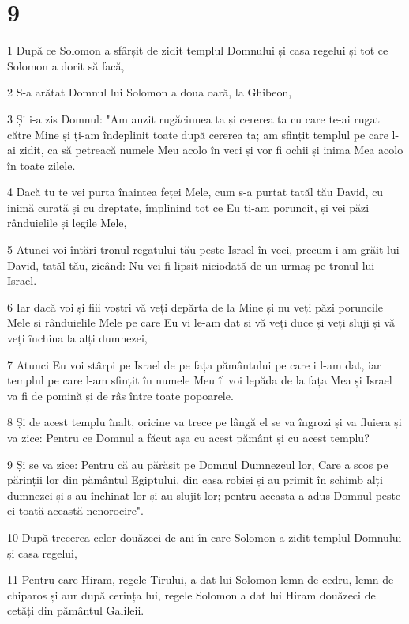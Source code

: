 \chapter{9}

\par 1 După ce Solomon a sfârșit de zidit templul Domnului și casa regelui și tot ce Solomon a dorit să facă,
\par 2 S-a arătat Domnul lui Solomon a doua oară, la Ghibeon,
\par 3 Și i-a zis Domnul: "Am auzit rugăciunea ta și cererea ta cu care te-ai rugat către Mine și ți-am îndeplinit toate după cererea ta; am sfințit templul pe care l-ai zidit, ca să petreacă numele Meu acolo în veci și vor fi ochii și inima Mea acolo în toate zilele.
\par 4 Dacă tu te vei purta înaintea feței Mele, cum s-a purtat tatăl tău David, cu inimă curată și cu dreptate, împlinind tot ce Eu ți-am poruncit, și vei păzi rânduielile și legile Mele,
\par 5 Atunci voi întări tronul regatului tău peste Israel în veci, precum i-am grăit lui David, tatăl tău, zicând: Nu vei fi lipsit niciodată de un urmaș pe tronul lui Israel.
\par 6 Iar dacă voi și fiii voștri vă veți depărta de la Mine și nu veți păzi poruncile Mele și rânduielile Mele pe care Eu vi le-am dat și vă veți duce și veți sluji și vă veți închina la alți dumnezei,
\par 7 Atunci Eu voi stârpi pe Israel de pe fața pământului pe care i l-am dat, iar templul pe care l-am sfințit în numele Meu îl voi lepăda de la fața Mea și Israel va fi de pomină și de râs între toate popoarele.
\par 8 Și de acest templu înalt, oricine va trece pe lângă el se va îngrozi și va fluiera și va zice: Pentru ce Domnul a făcut așa cu acest pământ și cu acest templu?
\par 9 Și se va zice: Pentru că au părăsit pe Domnul Dumnezeul lor, Care a scos pe părinții lor din pământul Egiptului, din casa robiei și au primit în schimb alți dumnezei și s-au închinat lor și au slujit lor; pentru aceasta a adus Domnul peste ei toată această nenorocire".
\par 10 După trecerea celor douăzeci de ani în care Solomon a zidit templul Domnului și casa regelui,
\par 11 Pentru care Hiram, regele Tirului, a dat lui Solomon lemn de cedru, lemn de chiparos și aur după cerința lui, regele Solomon a dat lui Hiram douăzeci de cetăți din pământul Galileii.
